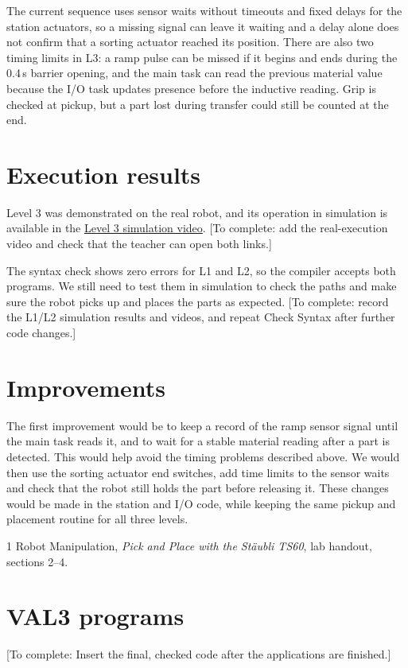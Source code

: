 \documentclass[11pt,a4paper]{article}
\newcommand{\todo}[1]{\textcolor{blue!60!black}{[To complete: #1]}}
\begin{document}
The current sequence uses sensor waits without timeouts and fixed delays for the station actuators, so a missing signal can leave it waiting and a delay alone does not confirm that a sorting actuator reached its position. There are also two timing limits in L3: a ramp pulse can be missed if it begins and ends during the 0.4\,s barrier opening, and the main task can read the previous material value because the I/O task updates presence before the inductive reading. Grip is checked at pickup, but a part lost during transfer could still be counted at the end.

\section{Execution results}
Level 3 was demonstrated on the real robot, and its operation in simulation is available in the \href{https://ugirona-my.sharepoint.com/:v:/g/personal/u6120632_udg_edu/IQCCHUXZbpDZQJx1GxVThgnPAUpKyrIblhpKYQN-_18FjhU?e=oOMlbG}{Level 3 simulation video}. \todo{add the real-execution video and check that the teacher can open both links.}

The syntax check shows zero errors for L1 and L2, so the compiler accepts both programs. We still need to test them in simulation to check the paths and make sure the robot picks up and places the parts as expected. \todo{record the L1/L2 simulation results and videos, and repeat Check Syntax after further code changes.}

\section{Improvements}
The first improvement would be to keep a record of the ramp sensor signal until the main task reads it, and to wait for a stable material reading after a part is detected. This would help avoid the timing problems described above. We would then use the sorting actuator end switches, add time limits to the sensor waits and check that the robot still holds the part before releasing it. These changes would be made in the station and I/O code, while keeping the same pickup and placement routine for all three levels.

\begin{thebibliography}{1}
     Robot Manipulation, \emph{Pick and Place with the St\"aubli TS60}, lab handout, sections 2--4.
    \end{thebibliography}

\clearpage
\appendix
\section{VAL3 programs}
\todo{Insert the final, checked code after the applications are finished.}
\end{document}
